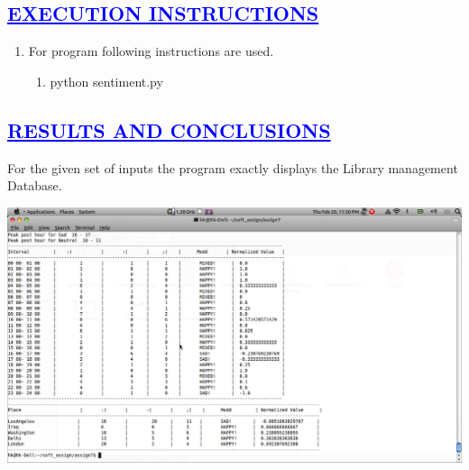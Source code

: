 \documentclass[a4paper,12pt]{report}
\begin{document}
\begin{center}
\chapter{\textcolor{blue}{\underline {EXECUTION INSTRUCTIONS}}}
\end{center}
\begin{enumerate}
 \item For program following instructions are used.
 \begin{enumerate}
  \item python sentiment.py
 \end{enumerate}

\end{enumerate}

\begin{center}
\chapter{\textcolor{blue}{\underline {RESULTS AND CONCLUSIONS}}}
\end{center}
\noindent For the given set of inputs the program exactly displays the Library management Database.\\
\begin{center}
 \includegraphics[width=13 cm,height=12 cm]{./Screenshot.png}
\end{center}
\end{document}
